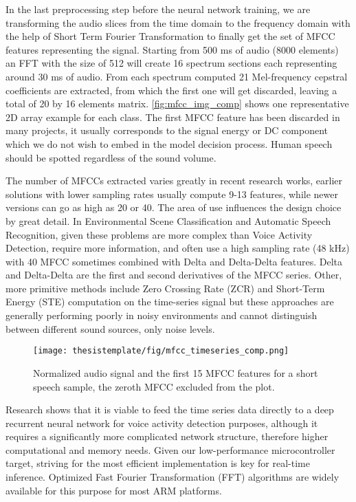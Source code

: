 In the last preprocessing step before the neural network training, we are transforming the audio slices from the time domain to the frequency domain with the help of Short Term Fourier Transformation to finally get the set of MFCC features representing the signal. Starting from 500 ms of audio (8000 elements) an FFT with the size of 512 will create 16 spectrum sections each representing around 30 ms of audio. From each spectrum computed 21 Mel-frequency cepstral coefficients are extracted, from which the first one will get discarded, leaving a total of 20 by 16 elements matrix. \autoref{fig:mfcc_img_comp} shows one representative 2D array example for each class. The first MFCC feature has been discarded in many projects, it usually corresponds to the signal energy or DC component which we do not wish to embed in the model decision process. Human speech should be spotted regardless of the sound volume.

The number of MFCCs extracted varies greatly in recent research works, earlier solutions with lower sampling rates usually compute 9-13 features, while newer versions can go as high as 20 or 40. The area of use influences the design choice by great detail. In Environmental Scene Classification and Automatic Speech Recognition, given these problems are more complex than Voice Activity Detection, require more information, and often use a high sampling rate (48 kHz) with 40 MFCC sometimes combined with Delta and Delta-Delta features. Delta and Delta-Delta are the first and second derivatives of the MFCC series. Other, more primitive methods include Zero Crossing Rate (ZCR) and Short-Term Energy (STE) computation on the time-series signal but these approaches are generally performing poorly in noisy environments and cannot distinguish between different sound sources, only noise levels.


\begin{figure}[ht!]
  \begin{center}
    \texttt{[image: thesistemplate/fig/mfcc\_timeseries\_comp.png]}
    \caption{Normalized audio signal and the first 15 MFCC features for a short speech sample, the zeroth MFCC excluded from the plot.}
    \label{fig:mfcc_time_comp}
  \end{center}
\end{figure}

Research shows that it is viable to feed the time series data directly to a deep recurrent neural network for voice activity detection purposes, although it requires a significantly more complicated network structure, therefore higher computational and memory needs. Given our low-performance microcontroller target, striving for the most efficient implementation is key for real-time inference. Optimized Fast Fourier Transformation (FFT) algorithms are widely available for this purpose for most ARM platforms.

